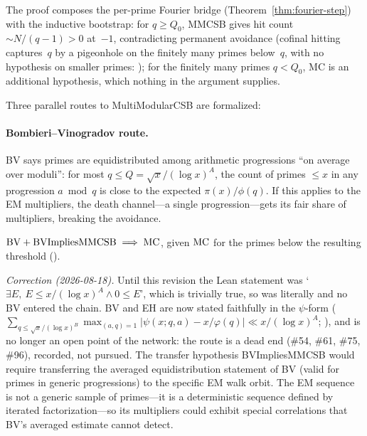 The proof composes the per-prime Fourier bridge
(Theorem~\ref{thm:fourier-step}) with the inductive bootstrap: for
$q \geq Q_0$, MMCSB gives hit count $\sim N/(q{-}1) > 0$ at~$-1$,
contradicting permanent avoidance (cofinal hitting captures~$q$ by a
pigeonhole on the finitely many primes below~$q$, with no hypothesis on
smaller primes: ); for the
finitely many primes $q < Q_0$, MC is an additional hypothesis, which
nothing in the argument supplies.

Three parallel routes to MultiModularCSB are formalized:

\paragraph{Bombieri--Vinogradov route.}
BV says primes are equidistributed among arithmetic progressions ``on
average over moduli'': for most $q \leq Q = \sqrt{x}/(\log x)^A$, the
count of primes $\leq x$ in any progression $a \bmod q$ is close to
the expected $\pi(x)/\phi(q)$.  If this applies to the EM multipliers,
the death channel---a single progression---gets its fair share of
multipliers, breaking the avoidance.

\begin{theorem}
$\mathrm{BV} + \mathrm{BVImpliesMMCSB} \;\Longrightarrow\; \mathrm{MC}$, given
$\mathrm{MC}$ for the primes below the resulting threshold ().
\end{theorem}
\noindent\emph{Correction (2026-08-18).}  Until this revision the Lean
statement  was `$\exists E,\ E \le x/(\log x)^A
\wedge 0 \le E$', which is trivially true, so  was
literally  and no BV entered the chain.  BV and EH
are now stated faithfully in the $\psi$-form
($\sum_{q \le \sqrt{x}/(\log x)^B} \max_{(a,q)=1} |\psi(x;q,a) - x/\varphi(q)|
\ll x/(\log x)^A$; ), and  is no longer
an open point of the network: the route is a dead end
(\#54, \#61, \#75, \#96), recorded, not pursued.  The transfer
hypothesis BVImpliesMMCSB would require transferring the averaged
equidistribution statement of BV
(valid for primes in generic progressions) to the specific EM walk orbit.
The EM sequence is not a generic sample of primes---it is a deterministic
sequence defined by iterated factorization---so its multipliers could
exhibit special correlations that BV's averaged estimate cannot detect.

